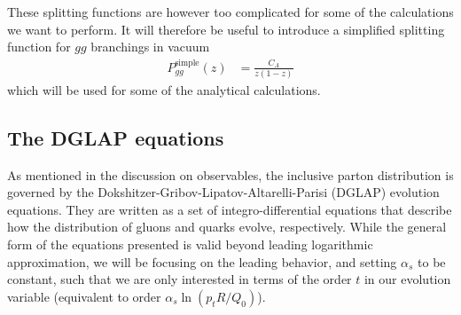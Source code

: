 \documentclass[main.tex]{subfiles}
\begin{document}
These splitting functions are however too complicated for some of the calculations we want to perform. It will therefore be useful to introduce a simplified splitting function for \(gg\) branchings in vacuum
\begin{align}\label{eqn: vacuum_gg_simple_splitting_function}
    P_{gg}^{\text{simple}}(z) &= \frac{C_A}{z(1-z)}
\end{align}
which will be used for some of the analytical calculations.

\subsection{The DGLAP equations}\label{sec: DGLAP_standard}
As mentioned in the discussion on observables, the inclusive parton distribution is governed by the Dokshitzer-Gribov-Lipatov-Altarelli-Parisi (DGLAP) evolution equations. They are written as a set of integro-differential equations that describe how the distribution of gluons and quarks evolve, respectively. While the general form of the equations presented is valid beyond leading logarithmic approximation, we will be focusing on the leading behavior, and setting \(\alpha_s\) to be constant, such that we are only interested in terms of the order \(t\) in our evolution variable (equivalent to order \(\alpha_s \ln(p_tR/Q_0)\)).
\end{document}
